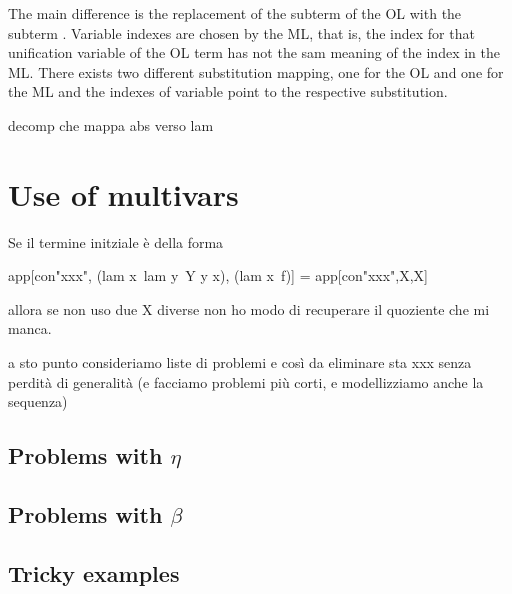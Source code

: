 \documentclass[sigconf,natbib=false]{acmart}
\begin{document}
\noindent
The main difference is the replacement of the subterm  of
the OL with the subterm . Variable indexes are chosen by the
ML, that is, the index  for that unification variable of the OL term
has not the sam meaning of the index  in the ML. There exists two
different substitution mapping, one for the OL and one for the ML and the indexes
of variable point to the respective substitution.

decomp che mappa abs verso lam
\noindent
{}

\section{Use of multivars}

Se il termine initziale è della forma

\begin{elpicode}
  app[con"xxx", (lam x\ lam y\ Y y x), (lam x\ f)]
  =
  app[con"xxx",X,X]
\end{elpicode}

allora se non uso due X diverse non ho modo di recuperare il quoziente che mi manca.

a sto punto consideriamo liste di problemi e così da eliminare sta xxx senza
perdità di generalità (e facciamo problemi più corti, e modellizziamo anche la
sequenza)

\subsection{Problems with $\eta$}

\subsection{Problems with $\beta$}


\subsection{Tricky examples}
\end{document}
